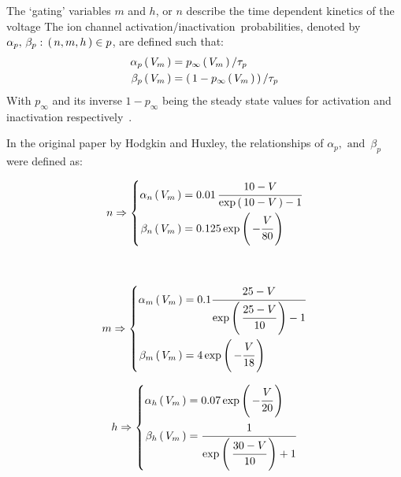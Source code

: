 \documentclass[../../Orator.tex]{subfiles}
\begin{document}
The `gating' variables \(m\) and \(h\), or \(n\) describe the time dependent kinetics of the voltage
The ion channel activation/inactivation\footnotemark~probabilities, denoted by \(\alpha_p, \, \beta_p : \, \left(\,n,m,h\,\right) \in p\), are defined such that:
\begin{align}
    \alpha_p\left(\,V_m\,\right) &= p_\infty \left(\,V_m\,\right) / \tau_p \\
    \beta_p\left(\,V_m\,\right)  &= \left(\,1 - p_\infty \left(\,V_m\,\right)\,\right) / \tau_p 
\end{align}
With \(p_\infty\) and its inverse \(1-p_\infty\) being the steady state values for activation and inactivation respectively~\cite{HodHux1952}. 


In the original paper by Hodgkin and Huxley, the relationships of \(\alpha_p, \text{ and }\, \beta_p\) were defined as:

\begin{minipage}{.45\textwidth}
\begin{equation*}
n \Rightarrow \left\{
\begin{aligned}
    \alpha_n \left(\,V_m\,\right) &= 0.01 \, \cfrac{ 10 - V }{ \mathrm{exp}\left(\, 10 - V \,\right) - 1} \\
    \beta_n \left(\,V_m\,\right)  &= 0.125 \, \mathrm{exp}\left(\,-\cfrac{V}{80}\,\right) 
\end{aligned} \right.
\end{equation*}
\end{minipage}
~
\begin{minipage}{.45\textwidth}
\begin{equation*}
m \Rightarrow \left\{
\begin{aligned}
    \alpha_m \left(\,V_m\,\right) &= 0.1 \cfrac{ 25 - V }{\mathrm{exp}\left(\,\cfrac{25-V}{10}\,\right) - 1} \\
    \beta_m \left(\,V_m\,\right)  &= 4 \, \mathrm{exp}\left(\,-\cfrac{V}{18}\,\right) 
\end{aligned} \right.
\end{equation*}
\end{minipage}

\begin{minipage}{.45\textwidth}
\begin{equation*}
h \Rightarrow \left\{
\begin{aligned}
    \alpha_h \left(\,V_m\,\right) &=  0.07 \, \mathrm{exp}\left(\,-\cfrac{V}{20}\,\right) \\
    \beta_h \left(\,V_m\,\right)  &= { \cfrac{1}{\mathrm{exp}\left(\,\cfrac{30 - V}{10}\,\right) + 1}}
\end{aligned} \right.
\end{equation*}
\end{minipage}
~
\begin{minipage}{.45\textwidth}
    \hfill
\end{minipage}
\end{document}
